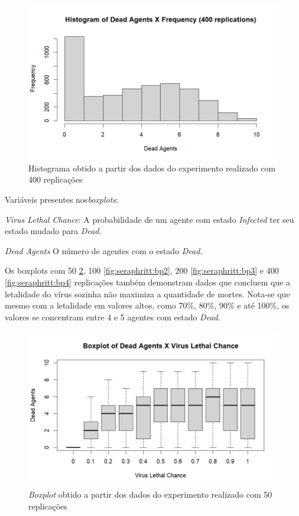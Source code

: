 \begin{figure}[H]
    \centering
    \includegraphics[angle=0,width=1\textwidth]{exploratory-data-analysis/seraphritt/PesqBibliogr/Virus-Network/Hist_400_repl.png}
    \caption{Histograma obtido a partir dos dados do experimento realizado com 400 replicações}
    \label{fig:seraphritt:hist4}
\end{figure}

Variáveis presentes nos\textit{boxplots}:
\begin{description}
\item\textit{Virus Lethal Chance}: A probabilidade de um agente com estado \textit{Infected} ter seu estado mudado para \textit{Dead}. 
\item \textit{Dead Agents} O número de agentes com o estado \textit{Dead}.
\end{description}

Os boxplots com 50 \ref{fig:seraphritt:bp1}, 100 \ref{fig:seraphritt:bp2}, 200 \ref{fig:seraphritt:bp3} e 400 \ref{fig:seraphritt:bp4} replicações também demonstram dados que concluem que a letalidade do vírus sozinha não maximiza a quantidade de mortes. Nota-se que mesmo com a letalidade em valores altos, como 70\%, 80\%, 90\% e até 100\%, os valores se concentram entre 4 e 5 agentes com estado \textit{Dead}. 

\begin{figure}[H]
    \centering
    \includegraphics[angle=0,width=1\textwidth]{exploratory-data-analysis/seraphritt/PesqBibliogr/Virus-Network/Boxplot_50_repl.png}
    \caption{\textit{Boxplot} obtido a partir dos dados do experimento realizado com 50 replicações}
    \label{fig:seraphritt:bp1}
\end{figure}

